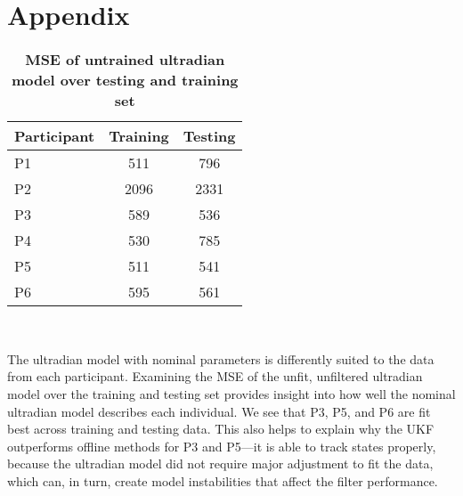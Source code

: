 \documentclass[10pt,letterpaper]{article}
\begin{document}
\clearpage

\section{Appendix}

\begin{table}[!ht]
\caption{{\bf MSE of untrained ultradian model over testing and training set}}
\label{table:nominalMSE}
\begin{tabular}{|l|c|c|}
  \hline
Participant & Training & Testing \\ 
  \hline
  P1 & 511 & 796 \\ \hline
  P2 & 2096 & 2331 \\ \hline
  P3 & 589 & 536 \\ \hline
  P4 & 530 & 785 \\ \hline
  P5 & 511 & 541 \\ \hline
  P6 & 595 & 561 \\ \hline
\end{tabular} \\
\begin{flushleft} The ultradian model with nominal parameters is differently suited to the data from each participant. Examining the MSE of the unfit, unfiltered ultradian model over the training and testing set provides insight into how well the nominal ultradian model describes each individual. We see that P3, P5, and P6 are fit best across training and testing data. This also helps to explain why the UKF outperforms offline methods for P3 and P5---it is able to track states properly, because the ultradian model did not require major adjustment to fit the data, which can, in turn, create model instabilities that affect the filter performance. 
\end{flushleft}
\end{table}
\end{document}

